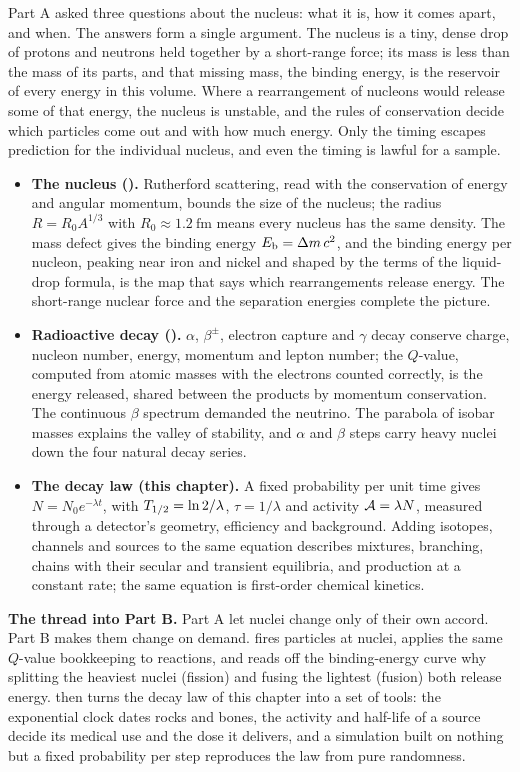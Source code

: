 Part A asked three questions about the nucleus: what it is, how it comes apart, and when. The answers
form a single argument. The nucleus is a tiny, dense drop of protons and neutrons held together by a
short-range force; its mass is less than the mass of its parts, and that missing mass, the binding
energy, is the reservoir of every energy in this volume. Where a rearrangement of nucleons would release
some of that energy, the nucleus is unstable, and the rules of conservation decide which particles come
out and with how much energy. Only the timing escapes prediction for the individual nucleus, and even
the timing is lawful for a sample.

\begin{itemize}
\item \textbf{The nucleus ().} Rutherford scattering, read with the conservation of
      energy and angular momentum, bounds the size of the nucleus; the radius $R=R_0A^{1/3}$ with
      $R_0\approx\SI{1.2}{\femto\metre}$ means every nucleus has the same density. The mass defect gives the
      binding energy $E_{\mathrm{b}}=\Delta m\,c^2$, and the binding energy per nucleon, peaking near iron and nickel and
      shaped by the terms of the liquid-drop formula, is the map that says which rearrangements release
      energy. The short-range nuclear force and the separation energies complete the picture.
\item \textbf{Radioactive decay ().} $\alpha$, $\beta^\pm$, electron capture and
      $\gamma$ decay conserve charge, nucleon number, energy, momentum and lepton number; the $Q$-value,
      computed from atomic masses with the electrons counted correctly, is the energy released, shared
      between the products by momentum conservation. The continuous $\beta$ spectrum demanded the
      neutrino. The parabola of isobar masses explains the valley of stability, and $\alpha$ and $\beta$
      steps carry heavy nuclei down the four natural decay series.
\item \textbf{The decay law (this chapter).} A fixed probability per unit time gives
      $N=N_0e^{-\lambda t}$, with $T_{1/2}=\ln2/\lambda$, $\tau=1/\lambda$ and activity $\mathcal{A}=\lambda N$,
      measured through a detector's geometry, efficiency and background. Adding isotopes, channels and
      sources to the same equation describes mixtures, branching, chains with their secular and transient
      equilibria, and production at a constant rate; the same equation is first-order chemical kinetics.
\end{itemize}

\noindent\textbf{The thread into Part B.} Part A let nuclei change only of their own accord. Part B makes
them change on demand.  fires particles at nuclei, applies the same $Q$-value
bookkeeping to reactions, and reads off the binding-energy curve why splitting the heaviest nuclei
(fission) and fusing the lightest (fusion) both release energy.  then turns the decay
law of this chapter into a set of tools: the exponential clock dates rocks and bones, the activity and
half-life of a source decide its medical use and the dose it delivers, and a simulation built on nothing
but a fixed probability per step reproduces the law from pure randomness.
